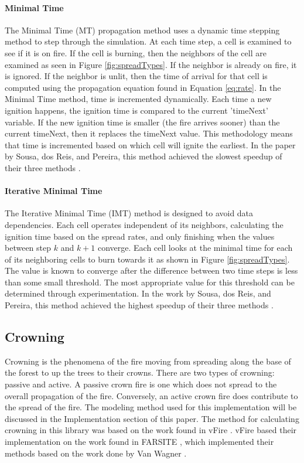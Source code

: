 \paragraph{Minimal Time}
The Minimal Time (MT) propagation method uses a dynamic time stepping method to step through the simulation. At each time step, a cell is examined to see if it is on fire. If the cell is burning, then the neighbors of the cell are examined as seen in Figure \ref{fig:spreadTypes}. If the neighbor is already on fire, it is ignored. If the neighbor is unlit, then the time of arrival for that cell is computed using the propagation equation found in Equation \ref{eq:rate}. In the Minimal Time method, time is incremented dynamically. Each time a new ignition happens, the ignition time is compared to the current 'timeNext' variable. If the new ignition time is smaller (the fire arrives sooner) than the current timeNext, then it replaces the timeNext value. This methodology means that time is incremented based on which cell will ignite the earliest. In the paper by Sousa, dos Reis, and Pereira, this method achieved the slowest speedup of their three methods \cite{gpufire}.

\paragraph{Iterative Minimal Time}
The Iterative Minimal Time (IMT) method is designed to avoid data dependencies. Each cell operates independent of its neighbors, calculating the ignition time based on the spread rates, and only finishing when the values between step $k$ and $k + 1$ converge. Each cell looks at the minimal time for each of its neighboring cells to burn towards it as shown in Figure \ref{fig:spreadTypes}. The value is known to converge after the difference between two time steps is less than some small threshold. The most appropriate value for this threshold can be determined through experimentation. In the work by Sousa, dos Reis, and Pereira, this method achieved the highest speedup of their three methods \cite{gpufire}. 

\subsection{Crowning}
Crowning is the phenomena of the fire moving from spreading along the base of the forest to up the trees to their crowns. There are two types of crowning: passive and active. A passive crown fire is one which does not spread to the overall propagation of the fire. Conversely, an active crown fire does contribute to the spread of the fire. The modeling method used for this implementation will be discussed in the Implementation section of this paper. The method for calculating crowning in this library was based on the work found in vFire \cite{vFire}. vFire based their implementation on the work found in FARSITE \cite{FARSITE}, which implemented their methods based on the work done by Van Wagner \cite{wagner1977}\cite{wagner1993}.

